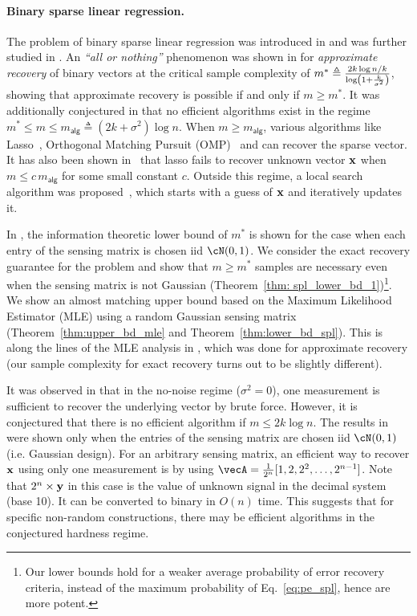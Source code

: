 \paragraph{Binary sparse linear regression.} The problem of binary sparse linear regression was introduced in \cite{david2017high, gamarnik2022sparse} and was further studied in \cite{pmlr-v99-reeves19a}. An {\em``all or nothing''} phenomenon was shown in \cite{pmlr-v99-reeves19a} for {\em approximate recovery} of binary vectors at the critical sample complexity of $m^* \triangleq \frac{2k\log{n/k}}{\log\left(1+\frac{k}{\sigma^2}\right)}$, showing that approximate recovery is possible if and only if $m\geq m^*$. It was additionally conjectured in \cite{david2017high} that no efficient algorithms exist in the regime $m^*\leq m \leq m_{\mathsf{alg}} \triangleq (2k+\sigma^2)\log{n}$. When $m\geq m_{\mathsf{alg}}$, various algorithms like Lasso~\cite{wainwright2009sharp}, Orthogonal Matching Pursuit (OMP)~\cite{tropp2007signal} and \cite{ndaoud2020optimal} can recover the sparse vector. It has also been shown in~\cite{gamarnik2017sparse} that lasso fails to recover unknown vector $\mathbf{x}$ when $m\leq c\, m_{\mathsf{alg}}$ for some small constant $c$. Outside this regime, a local search algorithm was proposed~\cite{gamarnik2017sparse}, which starts with a guess of $\mathbf{x}$ and iteratively updates it.

In \cite{pmlr-v99-reeves19a}, the information theoretic lower bound of $m^*$ is shown for the case when each entry of the sensing matrix is chosen iid $\cN(0,1)$. 
We consider the exact recovery guarantee for the problem and show that $m \geq m^*$ samples are necessary even when the sensing matrix is not Gaussian (Theorem~\ref{thm: spl_lower_bd_1})\footnote{Our lower bounds hold for a weaker average probability of error recovery criteria, instead of the maximum probability of Eq.~\eqref{eq:pe_spl}, hence are more potent.}. We show an almost matching upper bound based on the Maximum Likelihood Estimator (MLE) using a random Gaussian sensing matrix (Theorem~\ref{thm:upper_bd_mle} and Theorem~\ref{thm:lower_bd_spl}). This is along the lines of the MLE analysis in \cite{pmlr-v99-reeves19a}, which was done for approximate recovery (our sample complexity for exact recovery turns out to be slightly different).   
\begin{remark}\label{remark:noNoise}
It was observed in \cite{david2017high} that in the no-noise regime ($\sigma^2 = 0$), one measurement is sufficient to recover the underlying vector by brute force. However, it is conjectured that there is no efficient algorithm if $m\leq 2k\log{n}$. The results in \cite{david2017high} were shown only when the entries of the sensing matrix are chosen iid $\cN(0,1)$ (i.e. Gaussian design). For an arbitrary sensing matrix, an efficient way to recover $\mathbf{x}$ using only one measurement is by using $\vecA = \frac{1}{2^n}[1, 2, 2^2, \ldots,2^{n-1}]$. Note that $2^n \times \mathbf{y}$ in this case is the value of unknown signal in the decimal system (base 10). It can be converted to binary in $O(n)$ time. This suggests that for specific non-random constructions, there may be efficient algorithms in the conjectured hardness regime.
\end{remark}



